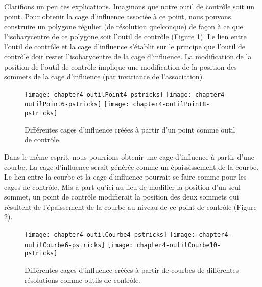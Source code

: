 Clarifions un peu ces explications. Imaginons que notre outil de contrôle soit
un point. Pour obtenir la cage d'influence associée à ce point, nous pouvons
construire un polygone régulier (de résolution quelconque) de façon à ce que
l'isobarycentre de ce polygone soit l'outil de contrôle (Figure \ref{EXTPoi}).
Le lien entre l'outil de contrôle et la cage d'influence s'établit sur le
principe que l'outil de contrôle doit rester l'isobarycentre de la cage
d'influence. La modification de la position de l'outil de contrôle implique
une modification de la position des sommets de la cage d'influence (par
invariance de l'association).

\begin{figure}[ht]
\begin{center}
  \texttt{[image: chapter4-outilPoint4-pstricks]}
  \texttt{[image: chapter4-outilPoint6-pstricks]}
  \texttt{[image: chapter4-outilPoint8-pstricks]}

  \caption[Cages d'influence à partir d'un point] {Différentes cages
d'influence créées à partir d'un point comme outil de contrôle.}
  \label{EXTPoi}

\end{center}
\end{figure}

Dans le même esprit, nous pourrions obtenir une cage d'influence à partir
d'une courbe. La cage d'influence serait générée comme un épaississement de la
courbe. Le lien entre la courbe et la cage d'influence pourrait se faire comme
pour les cages de contrôle. Mis à part qu'ici au lieu de modifier la position
d'un seul sommet, un point de contrôle modifierait la position des deux
sommets qui résultent de l'épaissement de la courbe au niveau de ce point de
contrôle (Figure \ref{EXTCou}).

\begin{figure}[ht]
\begin{center}
  \texttt{[image: chapter4-outilCourbe4-pstricks]}
  \texttt{[image: chapter4-outilCourbe6-pstricks]}
  \texttt{[image: chapter4-outilCourbe10-pstricks]}

  \caption[Cages d'influence à partir d'une courbe] {Différentes cages
d'influence créées à partir de courbes de différentes résolutions comme outils
de contrôle.}

  \label{EXTCou}

\end{center}
\end{figure}

